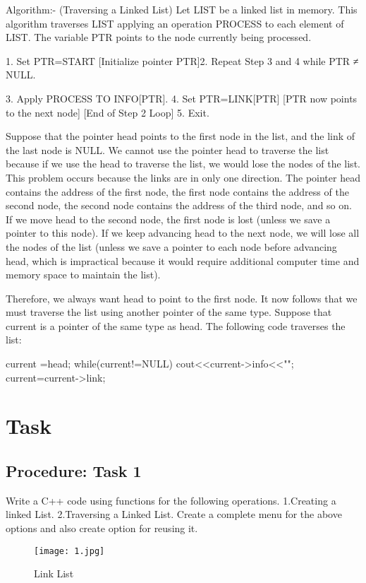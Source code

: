 \documentclass[11pt]{article}            %
\begin{document}
Algorithm:- 
(Traversing a Linked List) Let LIST be a linked list in memory. This algorithm traverses LIST applying an operation PROCESS to each element of LIST. The variable PTR points to the node currently being processed.

1. Set PTR=START [Initialize pointer PTR]2. Repeat Step 3 and 4 while PTR ≠ NULL.

3.	Apply PROCESS TO INFO[PTR].
4.	Set PTR=LINK[PTR] [PTR now points to the next node] [End of Step 2 Loop]
5.	Exit.

Suppose that the pointer head points to the first node in the list, and the link of the last node is NULL. We cannot use the pointer head to traverse the list because if we use the head to traverse the list, we would lose the nodes of the list. This problem occurs because the links are in only one direction. The pointer head contains the address of the first node, the first node contains the address of the second node, the second node contains the address of the third node, and so on. If we move head to the second node, the first node is lost (unless we save a pointer to this node). If we keep advancing head to the next node, we will lose all the nodes of the list (unless we save a pointer to each node before advancing head, which is impractical because it would require additional computer time and memory space to maintain the list). 

Therefore, we always want head to point to the first node. It now follows that we must traverse the list using another pointer of the same type. Suppose that current is a pointer of the same type as head. The following code traverses the list: 

		current =head; 
while(current!=NULL)  
 { 
cout<<current->info<<"";  
current=current->link;   
  } 

\section{Task}  
\subsection{Procedure: Task 1 }     
Write a C++ code using functions for the following operations.
1.Creating a linked List.
2.Traversing a Linked List.
Create a complete menu for the above options and also create option for reusing it.
\begin{figure*}
\centering
  \texttt{[image: 1.jpg]}
\caption{Link List}
\label{Figure:3}    
\end{figure*}
\end{document}
